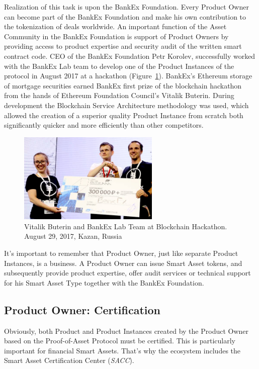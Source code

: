 \documentclass{article}
\begin{document}
\begin{multicols}{2}
Realization of this task is upon the BankEx Foundation. Every Product Owner can become part of the BankEx Foundation and make his own contribution to the tokenization of deals worldwide. An important function of the Asset Community in the BankEx Foundation is support of Product Owners by providing access to product expertise and security audit of the written smart contract code.
CEO of the BankEx Foundation Petr Korolev, successfully worked with the BankEx Lab team to develop one of the Product Instances of the protocol in August 2017 at a hackathon (Figure~\ref{fig:hackathon-2017}). BankEx’s Ethereum storage of mortgage securities earned BankEx first prize of the blockchain hackathon from the hands of Ethereum Foundation Council’s Vitalik Buterin. During development the Blockchain Service Architecture methodology was used, which allowed the creation of a superior quality Product Instance from scratch both significantly quicker and more efficiently than other competitors.

\begin{figure}
  \centering
  \includegraphics[width=0.6\textwidth]{hackathon-2017.jpg}
  \caption{Vitalik Buterin and BankEx Lab Team at Blockchain Hackathon. August 29, 2017, Kazan, Russia}
  \label{fig:hackathon-2017}
\end{figure}

It's important to remember that Product Owner, just like separate Product Instances, is a business. A Product Owner can issue Smart Asset tokens, and subsequently provide product expertise, offer audit services or technical support for his Smart Asset Type together with the BankEx Foundation.

\subsection{Product Owner: Certification}

Obviously, both Product and Product Instances created by the Product Owner based on the Proof-of-Asset Protocol must be certified. This is particularly important for financial Smart Assets. That’s why the ecosystem includes the Smart Asset Certification Center (\textit{SACC}).


\end{multicols}
\end{document}
